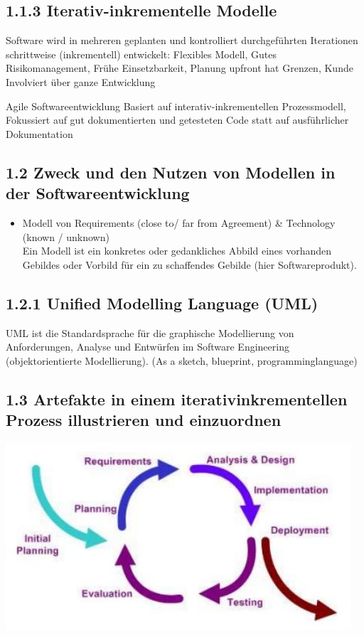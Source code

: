 \documentclass[10pt]{article}
\begin{document}
\subsection*{1.1.3 Iterativ-inkrementelle Modelle}
Software wird in mehreren geplanten und kontrolliert durchgeführten Iterationen schrittweise (inkrementell) entwickelt: Flexibles Modell, Gutes Risikomanagement, Frühe Einsetzbarkeit, Planung upfront hat Grenzen, Kunde Involviert über ganze Entwicklung

Agile Softwareentwicklung Basiert auf interativ-inkrementellen Prozessmodell, Fokussiert auf gut dokumentierten und getesteten Code statt auf ausführlicher Dokumentation

\subsection*{1.2 Zweck und den Nutzen von Modellen in der Softwareentwicklung}
\begin{itemize}
  \item Modell von Requirements (close to/ far from Agreement) \& Technology (known / unknown)\\
Ein Modell ist ein konkretes oder gedankliches Abbild eines vorhanden Gebildes oder Vorbild für ein zu schaffendes Gebilde (hier Softwareprodukt).
\end{itemize}

\subsection*{1.2.1 Unified Modelling Language (UML)}
UML ist die Standardsprache für die graphische Modellierung von Anforderungen, Analyse und Entwürfen im Software Engineering (objektorientierte Modellierung). (As a sketch, blueprint, programminglanguage)

\subsection*{1.3 Artefakte in einem iterativinkrementellen Prozess illustrieren und einzuordnen}
\begin{center}
\includegraphics[max width=\textwidth]{2024_12_29_0d1d7b5551ea1b4b41bdg-02(1)}
\end{center}
\end{document}
